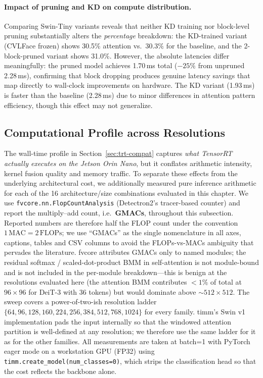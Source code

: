\documentclass[runningheads,a4paper]{llncs}
\begin{document}
\paragraph{Impact of pruning and KD on compute distribution.}
Comparing Swin-Tiny variants reveals that neither KD training nor block-level pruning substantially alters the \emph{percentage} breakdown: the KD-trained variant (CVLFace frozen) shows 30.5\% attention vs.\ 30.3\% for the baseline, and the 2-block-pruned variant shows 31.0\%. However, the absolute latencies differ meaningfully: the pruned model achieves 1.70\,ms total ($-25\%$ from unpruned 2.28\,ms), confirming that block dropping produces genuine latency savings that map directly to wall-clock improvements on hardware. The KD variant (1.93\,ms) is faster than the baseline (2.28\,ms) due to minor differences in attention pattern efficiency, though this effect may not generalize.

\subsection{Computational Profile across Resolutions}\label{sec:flops-profile}

The wall-time profile in Section~\ref{sec:trt-compat} captures \emph{what TensorRT actually executes on the Jetson Orin Nano}, but it conflates arithmetic intensity, kernel fusion quality and memory traffic. To separate these effects from the underlying architectural cost, we additionally measured pure inference arithmetic for each of the 16 architecture/size combinations evaluated in this chapter. We use \texttt{fvcore.nn.FlopCountAnalysis} (Detectron2's tracer-based counter) and report the multiply--add count, i.e.\ \textbf{GMACs}, throughout this subsection. Reported numbers are therefore half the FLOP count under the convention $1\,\text{MAC} = 2\,\text{FLOPs}$; we use ``GMACs'' as the single nomenclature in all axes, captions, tables and CSV columns to avoid the FLOPs-vs-MACs ambiguity that pervades the literature. fvcore attributes GMACs only to named modules; the residual softmax / scaled-dot-product BMM in self-attention is not module-bound and is not included in the per-module breakdown---this is benign at the resolutions evaluated here (the attention BMM contributes $<1\%$ of total at $96\times96$ for DeiT-3 with 36 tokens) but would dominate above $\sim$$512\times512$.
The sweep covers a power-of-two-ish resolution ladder $\{64, 96, 128, 160, 224, 256, 384, 512, 768, 1024\}$ for every family. timm's Swin v1 implementation pads the input internally so that the windowed attention partition is well-defined at any resolution; we therefore use the same ladder for it as for the other families. All measurements are taken at batch=1 with PyTorch eager mode on a workstation GPU (FP32) using \texttt{timm.create\_model(num\_classes=0)}, which strips the classification head so that the cost reflects the backbone alone.
\end{document}
